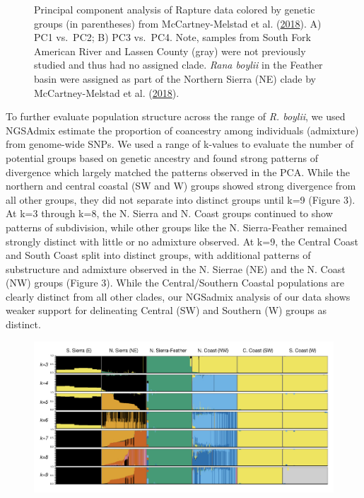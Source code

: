 \documentclass[proquest,12pt,final]{ucthesis-CA2012} %
\begin{document}
\begin{ucmainmatter}
\begin{figure}
{}

\caption{Principal component analysis of Rapture data colored by
genetic groups (in parentheses) from McCartney-Melstad et al.
(\protect\hyperlink{ref-mccartney-melstad_population_2018}{2018}). A)
PC1 vs.~PC2; B) PC3 vs.~PC4. Note, samples from South Fork American
River and Lassen County (gray) were not previously studied and thus had
no assigned clade. \emph{Rana boylii} in the Feather basin were assigned
as part of the Northern Sierra (NE) clade by McCartney-Melstad et al.
(\protect\hyperlink{ref-mccartney-melstad_population_2018}{2018}).}\label{fig:CH3F2pca}
\end{figure}
\clearpage

To further evaluate population structure across the range of \emph{R.
boylii}, we used NGSAdmix estimate the proportion of coancestry among
individuals (admixture) from genome-wide SNPs. We used a range of
k-values to evaluate the number of potential groups based on genetic
ancestry and found strong patterns of divergence which largely matched
the patterns observed in the PCA. While the northern and central coastal
(SW and W) groups showed strong divergence from all other groups, they
did not separate into distinct groups until k=9 (Figure 3). At k=3
through k=8, the N. Sierra and N. Coast groups continued to show
patterns of subdivision, while other groups like the N. Sierra-Feather
remained strongly distinct with little or no admixture observed. At k=9,
the Central Coast and South Coast split into distinct groups, with
additional patterns of substructure and admixture observed in the N.
Sierrae (NE) and the N. Coast (NW) groups (Figure 3). While the
Central/Southern Coastal populations are clearly distinct from all other
clades, our NGSadmix analysis of our data shows weaker support for
delineating Central (SW) and Southern (W) groups as distinct.





\begin{figure}

{\centering \includegraphics[width=0.95\linewidth]{figure/ch3/fig_03_admix_stacked_combined_rabo_filt_100k} 

}
\end{figure}
\end{ucmainmatter}
\end{document}
